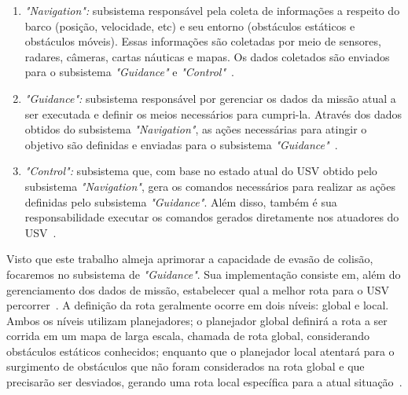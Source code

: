         \begin{enumerate}
            \item \textit{"Navigation":} subsistema responsável pela coleta de informações a respeito do barco (posição, velocidade, etc) e seu entorno (obstáculos estáticos e obstáculos móveis). Essas informações são coletadas por meio de sensores, radares, câmeras, cartas náuticas e mapas. Os dados coletados são enviados para o subsistema \textit{"Guidance"} e \textit{"Control"}~\cite{JURAK2020}.
            
            \item \textit{"Guidance":} subsistema responsável por gerenciar os dados da missão atual a ser executada e definir os meios necessários para cumpri-la. Através dos dados obtidos do subsistema \textit{"Navigation"}, as ações necessárias para atingir o objetivo são definidas e enviadas para o subsistema \textit{"Guidance"}~\cite{JURAK2020}.
            
            \item \textit{"Control":} subsistema que, com base no estado atual do USV obtido pelo subsistema \textit{"Navigation"}, gera os comandos necessários para realizar as ações definidas pelo subsistema \textit{"Guidance"}. Além disso, também é sua responsabilidade executar os comandos gerados diretamente nos atuadores do USV~\cite{JURAK2020}.
        \end{enumerate}
        
        Visto que este trabalho almeja aprimorar a capacidade de evasão de colisão, focaremos no subsistema de \textit{"Guidance"}. Sua implementação consiste em, além do gerenciamento dos dados de missão, estabelecer qual a melhor rota para o USV percorrer~\cite{JURAK2020}. A definição da rota geralmente ocorre em dois níveis: global e local. Ambos os níveis utilizam planejadores; o planejador global definirá a rota a ser corrida em um mapa de larga escala, chamada de rota global, considerando obstáculos estáticos conhecidos; enquanto que o planejador local atentará para o surgimento de obstáculos que não foram considerados na rota global e que precisarão ser desviados, gerando uma rota local específica para a atual situação~\cite{LIU201671}.
    
